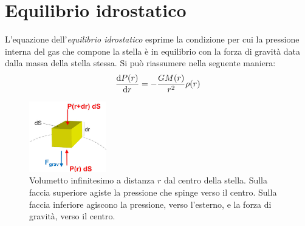\section{Equilibrio idrostatico}\label{sec:equilibrio-idrostatico}
L'equazione dell'\emph{equilibrio idrostatico} esprime la condizione per cui la pressione interna del gas che compone la stella è in equilibrio con la forza di gravità data dalla massa della stella stessa. Si può riassumere nella seguente maniera:
\begin{equation}\label{eq:equilibrio-idrostatico}
    \dfrac{\mathop{\mathrm{{}d}}\mathopen{} P(r)}{\mathop{\mathrm{{}d}}\mathopen{} r} = -\dfrac{G M(r)}{r^2} \rho(r)
\end{equation}

\begin{figure}
\centering
\includegraphics[width=0.3\textwidth]{immagini/equilibrio-idrostatico.jpg}
\caption{Volumetto infinitesimo a distanza $r$ dal centro della stella. Sulla faccia superiore agiste la pressione che spinge verso il centro. Sulla faccia inferiore agiscono la pressione, verso l'esterno, e la forza di gravità, verso il centro.}
\label{fig:equilibrio-idrostatico}
\end{figure}

